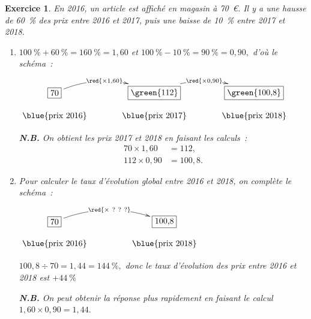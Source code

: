 \documentclass[10pt]{article}
\newtheorem{exo}{Exercice}
\begin{document}
\begin{exo}

En 2016, un article est affiché en magasin à 70~\euro. Il y a une hausse de 60~\% des prix entre 2016 et 2017, puis une baisse de 10~\% entre 2017 et 2018.
\begin{enumerate}
\item $100~\%+60~\%=160~\%=1,60$ et $100~\%-10~\%=90~\%=0,90,$ d'où le schéma~:%

\begin{center}
$\xymatrix@R=0.5pc@C=3pc{
    *+[F]+\txt{70} \ar@/^0.5cm/[r]|{\red{\times 1,60}} & 
    *+[F]+\txt{\green{112}} \ar@/^0.5cm/[r]|{\red{\times 0,90}} & *+[F]+\txt{\green{100,8}} \\
    \txt{\blue{prix 2016}}&
    \txt{\blue{prix 2017}}&\txt{\blue{prix 2018}}
    }$
    
    \end{center}
    
    \medskip
    
    \textbf{N.B.} On obtient les prix 2017 et 2018 en faisant les calculs~:
    \begin{align*}
    70\times 1,60&=112,\\ 112\times 0,90&=100,8.\end{align*}
    
\item Pour calculer le taux d'évolution global entre 2016 et 2018, on complète le schéma~:

\begin{center}
$\xymatrix@R=0.5pc@C=4pc{
    *+[F]+\txt{70} \ar@/^0.5cm/[r]|{\red{\times ~{?~?~?}}} & 
    *+[F]+\txt{100,8}  \\
    \txt{\blue{prix 2016}}&
    \txt{\blue{prix 2018}}}$
    
    \end{center}
    
    \medskip
    
    $100,8\div 70=1,44=144~\%,$ donc le taux d'évolution des prix entre 2016 et 2018 est $+44~\%$
    
    \medskip
    
    \textbf{N.B.} On peut obtenir la réponse plus rapidement en faisant le calcul $1,60\times 0,90=1,44.$


\end{enumerate}

\end{exo}
\end{document}
